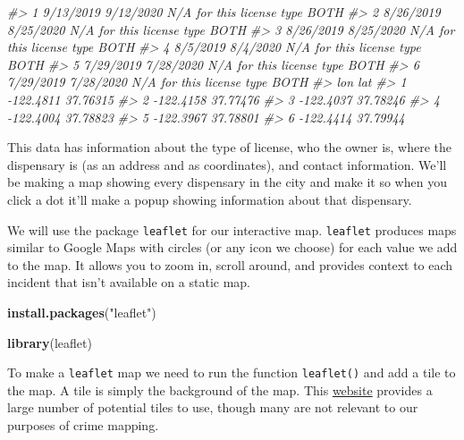 \documentclass[
  12pt,
]{book}
\newenvironment{Shaded}{\begin{snugshade}}{\end{snugshade}}
\newcommand{\CommentTok}[1]{\textcolor[rgb]{0.56,0.35,0.01}{\textit{#1}}}
\newcommand{\KeywordTok}[1]{\textcolor[rgb]{0.13,0.29,0.53}{\textbf{#1}}}
\newcommand{\NormalTok}[1]{#1}
\newcommand{\StringTok}[1]{\textcolor[rgb]{0.31,0.60,0.02}{#1}}
\begin{document}
\begin{Shaded}
\begin{Highlighting}[]
\CommentTok{\#> 1  9/13/2019       9/12/2020 N/A for this license type                BOTH}
\CommentTok{\#> 2  8/26/2019       8/25/2020 N/A for this license type                BOTH}
\CommentTok{\#> 3  8/26/2019       8/25/2020 N/A for this license type                BOTH}
\CommentTok{\#> 4   8/5/2019        8/4/2020 N/A for this license type                BOTH}
\CommentTok{\#> 5  7/29/2019       7/28/2020 N/A for this license type                BOTH}
\CommentTok{\#> 6  7/29/2019       7/28/2020 N/A for this license type                BOTH}
\CommentTok{\#>         lon      lat}
\CommentTok{\#> 1 {-}122.4811 37.76315}
\CommentTok{\#> 2 {-}122.4158 37.77476}
\CommentTok{\#> 3 {-}122.4037 37.78246}
\CommentTok{\#> 4 {-}122.4004 37.78823}
\CommentTok{\#> 5 {-}122.3967 37.78801}
\CommentTok{\#> 6 {-}122.4414 37.79944}
\end{Highlighting}
\end{Shaded}

This data has information about the type of license, who the owner is, where the dispensary is (as an address and as coordinates), and contact information. We'll be making a map showing every dispensary in the city and make it so when you click a dot it'll make a popup showing information about that dispensary.

We will use the package \texttt{leaflet} for our interactive map. \texttt{leaflet} produces maps similar to Google Maps with circles (or any icon we choose) for each value we add to the map. It allows you to zoom in, scroll around, and provides context to each incident that isn't available on a static map.

\begin{Shaded}
\begin{Highlighting}[]
\KeywordTok{install.packages}\NormalTok{(}\StringTok{"leaflet"}\NormalTok{)}
\end{Highlighting}
\end{Shaded}

\begin{Shaded}
\begin{Highlighting}[]
\KeywordTok{library}\NormalTok{(leaflet)}
\end{Highlighting}
\end{Shaded}

To make a \texttt{leaflet} map we need to run the function \texttt{leaflet()} and add a tile to the map. A tile is simply the background of the map. This \href{https://leaflet-extras.github.io/leaflet-providers/preview/}{website} provides a large number of potential tiles to use, though many are not relevant to our purposes of crime mapping.
\end{document}

